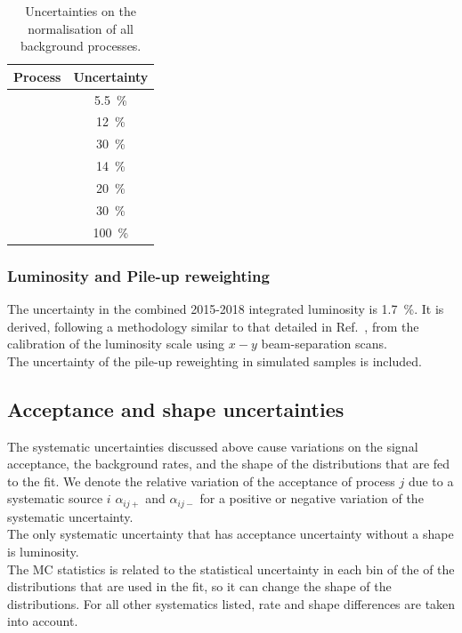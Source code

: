 \begin{table}[t]
	\centering
	\begin{tabular}{l c }
		\toprule
		\textbf{Process} & Uncertainty \\
		\midrule
		\ttbar & \SI{5.5}{\%} \\
		\ttV    & \SI{12}{\%} \\
		\tWZ & \SI{30}{\%} \\
		\tZq & \SI{14}{\%} \\
		\VVLF & \SI{20}{\%} \\
		\VVHF & \SI{30}{\%} \\
		\Zjets & \SI{100}{\%} \\
		\bottomrule
	\end{tabular}
	\caption{Uncertainties on the normalisation of all background processes.}
	\label{tab:syst-crosssections}
\end{table}

\subsubsection{Luminosity and Pile-up reweighting} 
The uncertainty in the combined 2015-2018 integrated luminosity is
\SI{1.7}{\%}. It is derived, following a methodology similar to that
detailed in Ref.~\cite{DAPR-2013-01}, from the calibration of the
luminosity scale using $x-y$ beam-separation scans.\\
The uncertainty of the pile-up reweighting in simulated samples is included.

\subsection {Acceptance and shape uncertainties}
\label{sec:systematic:treatment}

The systematic uncertainties discussed above cause variations on the signal
acceptance, the background rates, and the shape of the distributions
that are fed to the fit.
We denote the relative variation of the acceptance of process $j$
due to a systematic source $i$ $\alpha_{ij+}$ and $\alpha_{ij-}$ for a
positive or negative variation of the systematic uncertainty.		\\
The only systematic uncertainty that has acceptance uncertainty
without a shape is luminosity.\\
The MC statistics is related to the statistical uncertainty in each
bin of the of the distributions that are used in the fit,
so it can change the shape of the distributions. 
For all other systematics listed, rate and shape differences are taken
into account. 

